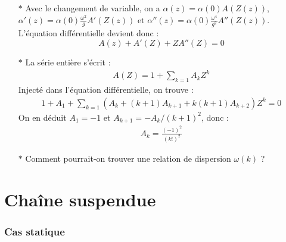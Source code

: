 \documentclass{report}
\begin{document}
\begin{itemize}
		\item[$\ast$] Avec le changement de variable, on a $\alpha(z)=\alpha(0)A(Z(z))$, $\alpha'(z)=\alpha(0)\frac{\omega^2}{g}A'(Z(z))$ et $\alpha''(z)=\alpha(0)\frac{\omega^4}{g^2}A''(Z(z))$. L'équation différentielle devient donc :
		\begin{equation}
			A(z)+A'(Z)+ZA''(Z)=0
		\end{equation}
		
		\item[$\ast$] La série entière s'écrit :
		\begin{align*}
			A(Z) = 1+\sum_{k=1} A_kZ^k
		\end{align*}
		Injecté dans l'équation différentielle, on trouve :
	\begin{align*}
		1+A_1+\sum_{k=1}(A_k+(k+1)A_{k+1}+k(k+1)A_{k+2})Z^k=0
	\end{align*}		
	On en déduit $A_1=-1$ et $A_{k+1}=-A_k/(k+1)^2$, donc :
	\begin{align*}
		A_k=\frac{(-1)^2}{(k!)^2}
	\end{align*}		
		
		\item[$\ast$] Comment pourrait-on trouver une relation de dispersion $\omega(k)$ ?
		
\end{itemize}

\section*{Chaîne suspendue}

\subsubsection{Cas statique}
\end{document}
